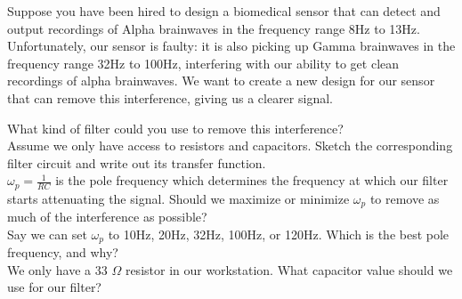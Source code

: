 
\begin{enumerate}
    \qitem Suppose you have been hired to design a biomedical sensor that can detect and output recordings of Alpha brainwaves in the frequency range 8Hz to 13Hz. Unfortunately, our sensor is faulty: it is also picking up Gamma brainwaves in the frequency range 32Hz to 100Hz, interfering with our ability to get clean recordings of alpha brainwaves. We want to create a new design for our sensor that can remove this interference, giving us a clearer signal.
    \begin{enumerate}
        \qitem What kind of filter could you use to remove this interference?
	\\

        \qitem Assume we only have access to resistors and capacitors. Sketch the corresponding filter circuit and write out its transfer function.
	\\

        \qitem $\omega_p = \frac{1}{RC}$ is the pole frequency which determines the frequency at which our filter starts attenuating the signal. Should we maximize or minimize $\omega_p$ to remove as much of the interference as possible?
	\\

        \qitem Say we can set $\omega_p$ to 10Hz, 20Hz, 32Hz, 100Hz, or 120Hz. Which is the best pole frequency, and why?
	\\

        \qitem We only have a 33 $\Omega$ resistor in our workstation. What capacitor value should we use for our filter?
	\\


\end{enumerate}
\end{enumerate}
